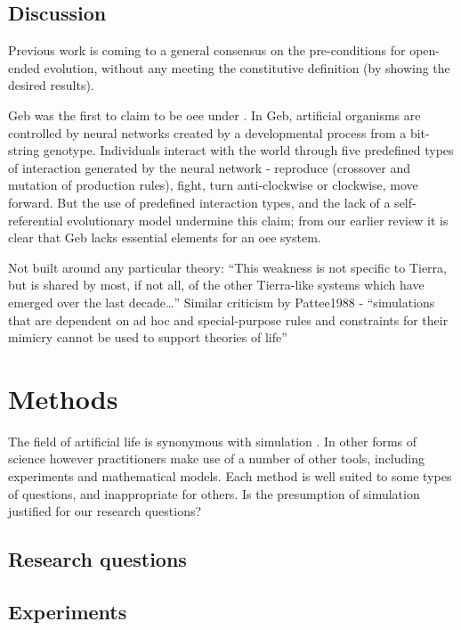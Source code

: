 \section{Discussion}
Previous work is coming to a general consensus on the pre-conditions for open-ended evolution, without any meeting the constitutive definition (by showing the desired results).

Geb \parencite{Channon:iw,Channon:2001ly} was the first to claim to be \gls{oee} under \cite{Bedau:2000mi}. In Geb, artificial organisms are controlled by neural networks created by a developmental process from a bit-string genotype. Individuals interact with the world through five predefined types of interaction generated by the neural network - reproduce (crossover and mutation of production rules), fight, turn anti-clockwise or clockwise, move forward. But the use of predefined interaction types, and the lack of a self-referential evolutionary model undermine this claim; from our earlier review it is clear that Geb lacks essential elements for an \gls{oee} system.

Not built around any particular theory:
``This weakness is not specific to Tierra, but is shared by most, if not all, of the other Tierra-like systems which have emerged over the last decade\ldots{}''\parencite{Taylor2001}
Similar criticism by Pattee1988 - ``simulations that are dependent on ad hoc and special-purpose rules and constraints for their mimicry cannot be used to support theories of life'' \parencite{Taylor2001}

\chapter{Methods}\label{methods}

The field of artificial life is synonymous with simulation \parencite[chap.2]{Aicardi2010}. In other forms of science however practitioners make use of a number of other tools, including experiments and mathematical models. Each method is well suited to some types of questions, and inappropriate for others. Is the presumption of simulation justified for our research questions?

\section{Research questions}\label{research-questions}

\section{Experiments}\label{experiments}


